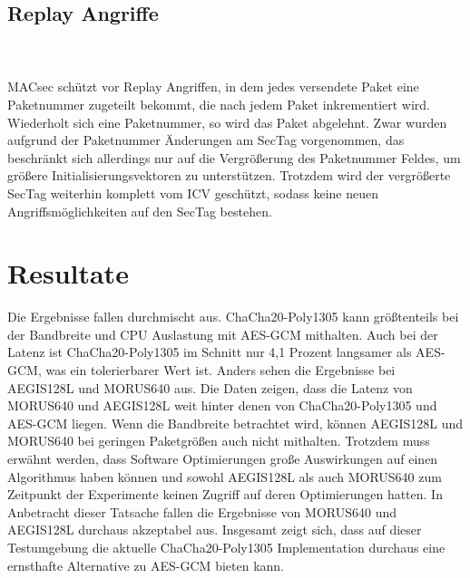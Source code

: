 \subsection{Replay Angriffe}
\\
\\
\gls{MACsec} schützt vor Replay Angriffen, in dem jedes versendete Paket eine Paketnummer zugeteilt bekommt, die nach jedem Paket inkrementiert wird. Wiederholt sich eine Paketnummer, so wird das Paket abgelehnt. Zwar wurden aufgrund der Paketnummer Änderungen am SecTag vorgenommen, das beschränkt sich allerdings nur auf die Vergrößerung des Paketnummer Feldes, um größere Initialisierungsvektoren zu unterstützen. Trotzdem wird der vergrößerte SecTag weiterhin komplett vom \gls{ICV} geschützt, sodass keine neuen Angriffsmöglichkeiten auf den SecTag bestehen.\clearpage
\section{Resultate}
Die Ergebnisse fallen durchmischt aus. 
ChaCha20-Poly1305 kann größtenteils bei der Bandbreite und \gls{CPU} Auslastung mit \gls{AES-GCM} mithalten. Auch bei der Latenz ist ChaCha20-Poly1305 im Schnitt nur 4,1 Prozent langsamer als \gls{AES-GCM}, was ein tolerierbarer Wert ist. Anders sehen die Ergebnisse bei AEGIS128L und MORUS640 aus. Die Daten zeigen, dass die Latenz von MORUS640 und AEGIS128L weit hinter denen von ChaCha20-Poly1305 und \gls{AES-GCM} liegen. Wenn die Bandbreite betrachtet wird, können AEGIS128L und MORUS640 bei geringen Paketgrößen auch nicht mithalten. Trotzdem muss erwähnt werden, dass Software Optimierungen große Auswirkungen auf einen Algorithmus haben können\cite{Ankele2016SoftwareBO} und sowohl AEGIS128L als auch MORUS640 zum Zeitpunkt der Experimente keinen Zugriff auf deren Optimierungen hatten. In Anbetracht dieser Tatsache fallen die Ergebnisse von MORUS640 und AEGIS128L durchaus akzeptabel aus. Insgesamt zeigt sich, dass auf dieser Testumgebung die aktuelle ChaCha20-Poly1305 Implementation durchaus eine ernsthafte Alternative zu \gls{AES-GCM} bieten kann.


